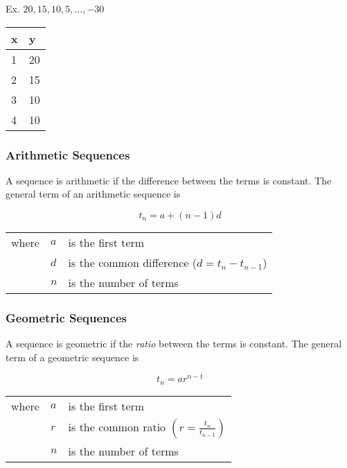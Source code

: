 \documentclass{article}
\numberwithin{equation}{section}
\begin{document}
\begin{center}
Ex. $20, 15, 10, 5, \dotso , -30$

\bigskip

\begin{tabular}{l | l}
	x & y \\ \hline 
	1 & 20 \\
	2 & 15 \\
	3 & 10 \\
	4 & 10 \\
\end{tabular}
\end{center}

\subsubsection{Arithmetic Sequences}

A sequence is arithmetic if the difference between the terms is constant. The general term of an arithmetic sequence is

\begin{equation}
	t_n = a + (n-1) d
\end{equation}

\begin{tabular}{l l l}
	where & $a$ &is the first term \\
	& $d$ &is the common difference ($d = t_n - t_{n-1}$) \\
	& $n$ &is the number of terms \\
\end{tabular}

\subsubsection{Geometric Sequences}

A sequence is geometric if the \emph{ratio} between the terms is constant. The general term of a geometric sequence is

\begin{equation}
	t_n = ar^{n-1} 
\end{equation}

\begin{tabular}{l l l}
	where & $a$ &is the first term \\
	& $r$ &is the common ratio $\left(r = \frac{t_n}{t_{n-1}} \right)$ \\
	& $n$ &is the number of terms \\
\end{tabular}
\end{document}
